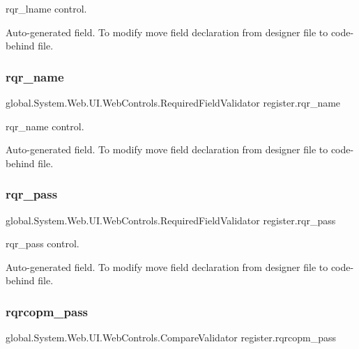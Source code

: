 rqr\+\_\+lname control. 

Auto-\/generated field. To modify move field declaration from designer file to code-\/behind file. \mbox{\label{classregister_a3df4e9fab8d71055df7108ecdfc63686}} 
\subsubsection{\texorpdfstring{rqr\_name}{rqr\_name}}
{\footnotesize\ttfamily global.\+System.\+Web.\+U\+I.\+Web\+Controls.\+Required\+Field\+Validator register.\+rqr\+\_\+name\hspace{0.3cm}{\ttfamily [protected]}}



rqr\+\_\+name control. 

Auto-\/generated field. To modify move field declaration from designer file to code-\/behind file. \mbox{\label{classregister_a4d5b8e2bcd936d7fce72c0c6b0f4d960}} 
\subsubsection{\texorpdfstring{rqr\_pass}{rqr\_pass}}
{\footnotesize\ttfamily global.\+System.\+Web.\+U\+I.\+Web\+Controls.\+Required\+Field\+Validator register.\+rqr\+\_\+pass\hspace{0.3cm}{\ttfamily [protected]}}



rqr\+\_\+pass control. 

Auto-\/generated field. To modify move field declaration from designer file to code-\/behind file. \mbox{\label{classregister_a6bfe274bf7682911b553549ebfcb72cb}} 
\subsubsection{\texorpdfstring{rqrcopm\_pass}{rqrcopm\_pass}}
{\footnotesize\ttfamily global.\+System.\+Web.\+U\+I.\+Web\+Controls.\+Compare\+Validator register.\+rqrcopm\+\_\+pass\hspace{0.3cm}{\ttfamily [protected]}}



